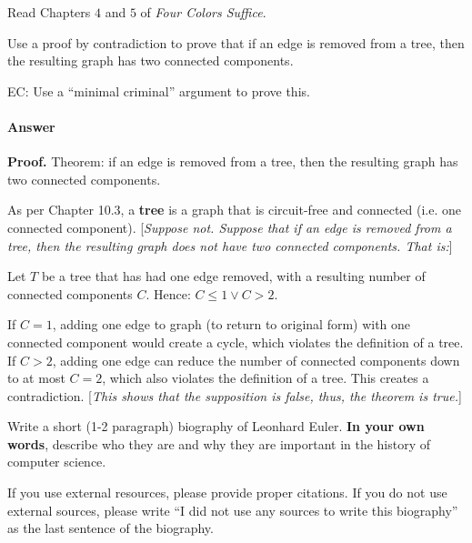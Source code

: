 \documentclass{article}
\begin{document}
\collab{} 

Read Chapters $4$ and $5$ of \emph{Four Colors Suffice}.

Use a proof by contradiction to prove that if an edge is removed from a
tree, then the resulting graph has two connected components.

EC:
Use a ``minimal criminal'' argument to prove this.

        \paragraph{Answer}
\textbf{Proof.}
Theorem: if an edge is removed from a tree, then the resulting graph has two connected components.

As per Chapter 10.3, a \textbf{tree} is a graph that is circuit-free and connected (i.e. one connected component).
[\emph{Suppose not. Suppose that if an edge is removed from a tree, then the resulting graph does not have two connected components. That is:}]

Let $T$ be a tree that has had one edge removed, with a resulting number of connected components $C$. Hence: $C \leq 1 \lor C > 2$.

If $C = 1$, adding one edge to graph (to return to original form) with one connected component would create a cycle, which violates the definition of a tree. If $C > 2$, adding one edge can reduce the number of connected components down to at most $C = 2$, which also violates the definition of a tree. This creates a contradiction. [\emph{This shows that the supposition is false, thus, the theorem is true.}]

\collab{}

Write a short (1-2 paragraph) biography of Leonhard Euler.
\textbf{In your own words}, describe who they are and why they are important in
the history of computer science.

If you use external resources, please provide
proper citations. If you do not use external sources, please write ``I did not
use any sources to write this biography'' as the last sentence of the
biography.
\end{document}
